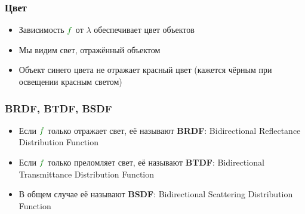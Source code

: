 \documentclass{beamer}
\begin{document}
\begin{frame}[fragile]
\frametitle{Цвет}
\begin{itemize}
\item Зависимость \begin{math}{\color{green}f}\end{math} от \begin{math}\lambda\end{math} обеспечивает цвет объектов
\pause
\item Мы видим свет, отражённый объектом
\pause
\item Объект синего цвета не отражает красный цвет (кажется чёрным при освещении красным светом)
\end{itemize}
\end{frame}

\begin{frame}[fragile]
\frametitle{BRDF, BTDF, BSDF}
\begin{itemize}
\item Если \begin{math}{\color{green}f}\end{math} только отражает свет, её называют \textbf{BRDF}: Bidirectional Reflectance Distribution Function
\pause 
\item Если \begin{math}{\color{green}f}\end{math} только преломляет свет, её называют \textbf{BTDF}: Bidirectional Transmittance Distribution Function
\pause 
\item В общем случае её называют \textbf{BSDF}: Bidirectional Scattering Distribution Function
\end{itemize}
\end{frame}
\end{document}
